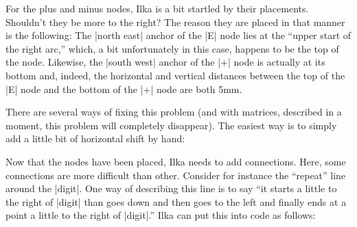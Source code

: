 For the plus and minus nodes, Ilka is a bit startled by their
placements. Shouldn't they be more to the right? The reason they are
placed in that manner is the following: The |north east| anchor of the
|E| node lies at the ``upper start of the right arc,'' which, a bit
unfortunately in this case, happens to be the top of the
node. Likewise, the |south west| anchor of the |+| node is actually at
its bottom and, indeed, the horizontal and vertical distances between
the top of the |E| node and the bottom of the |+| node are both 5mm.

There are several ways of fixing this problem (and with matrices,
described in a moment, this problem will completely disappear). The
easiest way is to simply add a little bit of horizontal shift by hand:
\begin{codeexample}[]
\end{codeexample}

Now that the nodes have been placed, Ilka needs to add
connections. Here, some connections are more difficult than
other. Consider for instance the ``repeat'' line around the
|digit|. One way of describing this line is to say ``it starts a
little to the right of |digit| than goes down and then goes to the
left and finally ends at a point a little to the right of |digit|.''
Ilka can put this into code as follows:
\begin{codeexample}[]
\end{codeexample}


